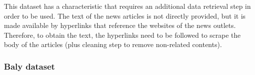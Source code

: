 


This dataset has a characteristic that requires an additional data retrieval step in order to be used.
The text of the news articles is not directly provided, but it is made available by hyperlinks that reference the websites of the news outlets.
Therefore, to obtain the text, the hyperlinks need to be followed to scrape the body of the articles (plus cleaning step to remove non-related contents).





\subsubsection{Baly dataset}

